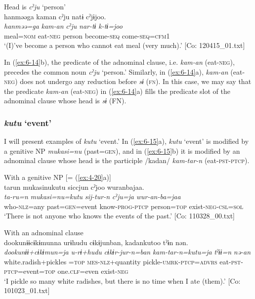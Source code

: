 \ex Head is \textit{cˀju} ‘person’\\
{\TM}
\glll  hanməəga  kaman  cˀju  natɨ  cˀjɨjoo.\\
\textit{hanməə=ga}  \textit{kam-an}  \textit{cˀju}  \textit{nar-tɨ}  \textit{k-tɨ=joo}\\
meal=\textsc{nom}  eat-\textsc{neg}  person  become-\textsc{seq}  come-\textsc{seq}=\textsc{cfm}1\\
\glt ‘(I)’ve become a person who cannot eat meal (very much).’ [Co: 120415\_01.txt]
\z
\z

In (\ref{ex:6-14}b), the predicate of the adnominal clause, i.e. \textit{kam-an} (eat-\textsc{neg}), precedes the common noun \textit{cˀju} ‘person.’ Similarly, in (\ref{ex:6-14}a), \textit{kam-an} (eat-\textsc{neg}) does not undergo any reduction before \textit{sɨ} (\textsc{fn}). In this case, we may say that the predicate \textit{kam-an} (eat-\textsc{neg}) in (\ref{ex:6-14}a) fills the predicate slot of the adnominal clause whose head is \textit{sɨ} (FN).

\subsubsection{\textit{kutu} ‘event’}

I will present examples of \textit{kutu} ‘event.’ In (\ref{ex:6-15}a), \textit{kutu} ‘event’ is modified by a genitive NP \textit{mukasi=nu} (past=\textsc{gen}), and in (\ref{ex:6-15}b) it is modified by an adnominal clause whose head is the participle /kadan/ \textit{kam-tar-n} (eat-\textsc{pst}-\textsc{ptcp}).

\ea\label{ex:6-15}
\ea With a genitive NP [= (\ref{ex:4-20}a)]\\
{\TM}
\glll  tarun  mukasinukutu  siccjun  cˀjoo  wuranbajaa.\\
\textit{ta-ru=n}  \textit{mukasi=nu=kutu}  \textit{sij-tur-n} \textit{cˀju=ja}  \textit{wur-an-ba=jaa}\\
who-\textsc{nlz}=any  past=\textsc{gen}=event  know-\textsc{prog}-\textsc{ptcp}   person=\textsc{top}  exist-\textsc{neg}-\textsc{csl}=\textsc{sol}\\
\glt ‘There is not anyone who knows the events of the past.’ [Co: 110328\_00.txt]
\z

\ex With an adnominal clause\\
{\TM}
\glll  dookunɨɨcɨkɨmunna  urɨhudu  cɨkɨjunban,  kadankutoo  tˀɨn   nən.\\
\textit{dookunɨɨ+cɨkɨmun=ja}  \textit{u-rɨ+hudu}   \textit{cɨkɨr-jur-n=ban}  \textit{kam-tar-n=kutu=ja}  \textit{tˀɨɨ=n}  \textit{nə-an}\\
white.radish+pickles =\textsc{top}  \textsc{mes}-\textsc{nlz}+quantity  pickle-\textsc{umrk}-\textsc{ptcp}=\textsc{advrs}  eat-\textsc{pst}-\textsc{ptcp}=event=\textsc{top}  one.\textsc{clf}=even   exist-\textsc{neg}\\
\glt ‘I pickle so many white radishes, but there is no time when I ate (them).’ [Co: 101023\_01.txt]
\z

